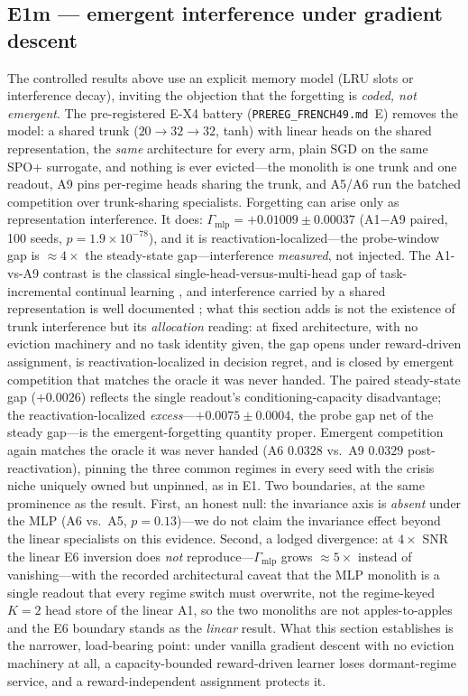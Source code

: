 \documentclass{article}
\begin{document}
\subsection{E1m --- emergent interference under gradient descent}
\label{sec:e1m}

The controlled results above use an explicit memory model (LRU slots
or interference decay), inviting the objection that the forgetting is
\emph{coded, not emergent}. The pre-registered E-X4 battery
(\texttt{PREREG\_FRENCH49.md}~E) removes the model: a shared trunk
($20 \to 32 \to 32$, tanh) with linear heads on the shared
representation, the \emph{same} architecture for every arm, plain SGD
on the same SPO+ surrogate, and nothing is ever evicted---the monolith
is one trunk and one readout, A9 pins per-regime heads sharing the
trunk, and A5/A6 run the batched competition over trunk-sharing
specialists. Forgetting can arise only as representation interference.
It does: $\Gamma_{\mathrm{mlp}} = +0.01009 \pm 0.00037$ (A1$-$A9
paired, 100 seeds, $p = 1.9\times10^{-78}$), and it is
reactivation-localized---the probe-window gap is ${\approx}4\times$
the steady-state gap---interference \emph{measured}, not injected.
The A1-vs-A9 contrast is the classical single-head-versus-multi-head gap
of task-incremental continual learning \citep{vandeven2019three,
farquhar2018towards}, and interference carried by a shared
representation is well documented \citep{ramasesh2021anatomy}; what this
section adds is not the existence of trunk interference but its
\emph{allocation} reading: at fixed architecture, with no eviction
machinery and no task identity given, the gap opens under reward-driven
assignment, is reactivation-localized in decision regret, and is closed
by emergent competition that matches the oracle it was never handed.
The paired steady-state gap ($+0.0026$) reflects the single readout's
conditioning-capacity disadvantage; the reactivation-localized
\emph{excess}---$+0.0075 \pm 0.0004$, the probe gap net of the steady
gap---is the emergent-forgetting quantity proper.
Emergent competition again matches the oracle it was never handed
(A6 $0.0328$ vs.\ A9 $0.0329$ post-reactivation), pinning the three
common regimes in every seed with the crisis niche uniquely owned but
unpinned, as in E1. Two boundaries, at the same prominence as the
result. First, an honest null: the invariance axis is \emph{absent}
under the MLP (A6 vs.\ A5, $p = 0.13$)---we do not claim the
invariance effect beyond the linear specialists on this evidence.
Second, a lodged divergence: at $4\times$ SNR the linear E6 inversion
does \emph{not} reproduce---$\Gamma_{\mathrm{mlp}}$ grows
${\approx}5\times$ instead of vanishing---with the recorded
architectural caveat that the MLP monolith is a single readout that
every regime switch must overwrite, not the regime-keyed $K{=}2$ head
store of the linear A1, so the two monoliths are not apples-to-apples
and the E6 boundary stands as the \emph{linear} result. What this
section establishes is the narrower, load-bearing point: under vanilla
gradient descent with no eviction machinery at all, a capacity-bounded
reward-driven learner loses dormant-regime service, and a
reward-independent assignment protects it.
\end{document}
